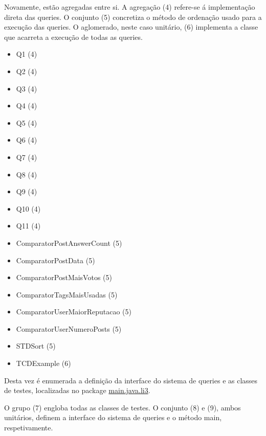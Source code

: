 \documentclass[11pt,a4paper]{article}
\begin{document}
Novamente, estão agregadas entre si. A agregação (4) refere-se á implementação direta das queries.
O conjunto (5) concretiza o método de ordenação usado para a execução das queries.
O aglomerado, neste caso unitário, (6) implementa a classe que acarreta a execução de todas as queries.
\begin{itemize}
	\item Q1                             (4)
	\item Q2                             (4)
	\item Q3                             (4)
	\item Q4           	                 (4)
	\item Q5                             (4)
	\item Q6                             (4)
	\item Q7   	                         (4)
	\item Q8                             (4)
	\item Q9                             (4)
	\item Q10                            (4)
	\item Q11                            (4)
	\item ComparatorPostAnswerCount      (5)
    \item ComparatorPostData             (5)
    \item ComparatorPostMaisVotos        (5)
    \item ComparatorTagsMaisUsadas       (5)
    \item ComparatorUserMaiorReputacao   (5)
    \item ComparatorUserNumeroPosts      (5)
    \item STDSort                        (5)
    \item TCDExample                     (6)
\end{itemize}

Desta vez é enumerada a definição da interface do sistema de queries e as classes de testes, localizadas no package \underline{main.java.li3}.\newline

O grupo (7) engloba todas as classes de testes. O conjunto (8) e (9), ambos
unitários, definem a interface do sistema de queries e o método main, respetivamente.
\end{document}
